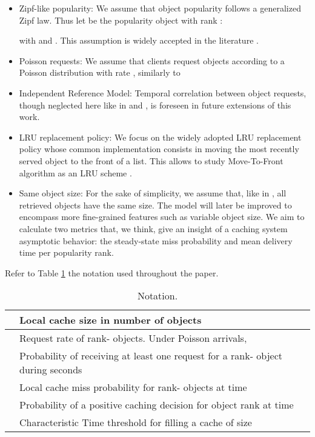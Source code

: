 \documentclass[conference]{IEEEtran}
\begin{document}
\begin{itemize}
\item{Zipf-like popularity:}
We assume that object popularity follows a generalized Zipf 
law. Thus let  be the popularity object with rank :

with   and 
. This assumption is widely accepted in the 
literature \cite{breslau:web} 
\cite{Mitra:2011:CWV:1961659.1961662}.

\item{Poisson requests:}
We assume that clients request objects according to a Poisson 
distribution with rate , similarly to 
\cite{Carofiglio:2013:PBS:2542828.2542992}

\item{Independent Reference Model:}
Temporal correlation between object requests, though 
neglected here like in 
\cite{Starobinski:2001:PMW:570289.570293} and 
\cite{Fricker:2012:VAA:2414276.2414286}, is foreseen in 
future extensions of this work.

\item{LRU replacement policy:} We focus on the widely adopted 
LRU replacement policy whose common implementation consists 
in moving the most recently served object to 
the front of a list. This allows to study Move-To-Front 
algorithm as an LRU scheme 
\cite{Jelenkovic:2004:OLC:1024662.1024670}.

\item{Same object size:} For the sake of simplicity, we 
assume that, like in \cite{Che:2006:HWC:2312147.2313846}, all 
retrieved objects have the same size. The model will later be 
improved to encompass more fine-grained features such as 
variable object size. We aim to calculate two metrics that, 
we think, give an insight  of a caching system asymptotic 
behavior: the steady-state miss probability  and mean 
delivery time per popularity rank.
\end{itemize}

Refer to Table \ref{tab:symbols} the notation used throughout 
the paper.

\begin{table}[htb!]
\begin{footnotesize}
\centering
\begin{tabular}{|l||p{7cm}|}
\hline
 & Local cache size in number of objects\\
\hline
 & Request rate of rank- objects. Under Poisson arrivals, \\
\hline
 & Probability of receiving at least one request for a rank- object during  seconds\\
\hline
 & Local cache miss probability for rank- objects at time \\
\hline
 & Probability of a positive caching decision for object rank  at time \\
\hline
 & Characteristic Time threshold for filling a cache of size \\
\hline
\end{tabular}
\caption{Notation.}\label{tab:symbols}
\end{footnotesize}
\end{table}
\end{document}

